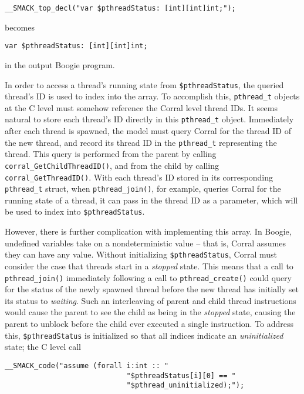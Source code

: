\begin{lstlisting}[frame=none,xleftmargin=2\parindent]
__SMACK_top_decl("var $pthreadStatus: [int][int]int;");
\end{lstlisting}

\noindent becomes

\begin{lstlisting}[frame=none,xleftmargin=2\parindent,language=boogie]
var $pthreadStatus: [int][int]int;
\end{lstlisting}

\noindent in the output Boogie program.

In order to access a thread's running state from
\lstinline|$pthreadStatus|, the queried thread's ID is used to index
into the array.  To accomplish this, \lstinline|pthread_t| objects at
the C level must somehow  reference the Corral level thread IDs. It
seems natural to store each thread's ID directly in this
\lstinline|pthread_t| object. Immediately after each thread is
spawned, the model must query Corral for the thread ID of the new
thread, and record its thread ID in the \lstinline|pthread_t|
representing the thread.  This query is performed from the parent by
calling \lstinline|corral_GetChildThreadID()|, and from the child by
calling \lstinline|corral_GetThreadID()|.  With each thread's ID
stored in its corresponding \lstinline|pthread_t| struct, when
\lstinline|pthread_join()|, for example, queries Corral for the
running state of a thread, it can pass in the thread ID as a
parameter, which will be used to index into
\lstinline|$pthreadStatus|. 

However, there is further complication with implementing this
array. In Boogie, undefined variables take on a nondeterministic value
-- that is, Corral assumes they can have any value.  Without
initializing \lstinline|$pthreadStatus|, Corral must consider the case
that threads start in a \emph{stopped} state.  This means that a call
to \lstinline|pthread_join()| immediately following a call to
\lstinline|pthread_create()| could query for the status of the newly
spawned thread before the new thread has initially set its status to
\emph{waiting}.  Such an interleaving of parent and child thread
instructions would cause the parent to see the child as being in the
\emph{stopped} state, causing the parent to unblock before the child
ever executed a single instruction. To address this,
\lstinline|$pthreadStatus| is initialized so that all indices indicate
an \emph{uninitialized} state; the C level call
 
\begin{lstlisting}[frame=none,xleftmargin=2\parindent]
__SMACK_code("assume (forall i:int :: "
                             "$pthreadStatus[i][0] == "
                             "$pthread_uninitialized);"); 
\end{lstlisting}

